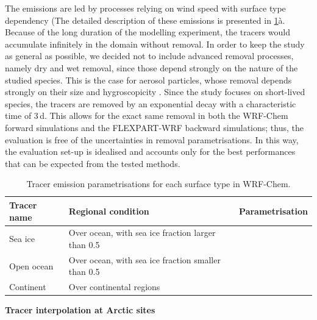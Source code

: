             The emissions are led by processes relying on wind speed with surface type dependency (The detailed description of these emissions is presented in \cref{P1tab:emissions_tracers}à.
            Because of the long duration of the modelling experiment, the tracers would accumulate infinitely in the domain without removal. In order to keep the study as general as possible, we decided not to include advanced removal processes, namely dry and wet removal, since those depend strongly on the nature of the studied species. This is the case for aerosol particles, whose removal depends strongly on their size and hygroscopicity \citep{ohata_key_2016, farmer_dry_2021}.
            Since the study focuses on short-lived species, the tracers are removed by an exponential decay with a characteristic time of 3\,d. This allows for the exact same removal in both the WRF-Chem forward simulations and the FLEXPART-WRF backward simulations; thus, the evaluation is free of the uncertainties in removal parametrisations.
            In this way, the evaluation set-up is idealised and accounts only for the best performances that can be expected from the tested methods.

            \begin{table}[t]
                \centering
                \caption{Tracer emission parametrisations for each surface type in WRF-Chem.}
                \begin{tabular}{l|l|l}
                    \toprule
                    \textbf{Tracer name} & \textbf{Regional condition} & \textbf{Parametrisation}\\
                    \midrule
                    Sea ice & Over ocean, with sea ice fraction larger than 0.5 &  \citet{monahan_model_1986}\\
                    Open ocean & Over ocean, with sea ice fraction smaller than 0.5 & \citet{monahan_model_1986}\\
                    Continent & Over continental regions & \citet{ginoux_sources_2001}\\
                    \bottomrule
                \end{tabular}
                \label{P1tab:emissions_tracers}
            \end{table}

            \vspace{\baselineskip}
            \textbf{Tracer interpolation at Arctic sites}

